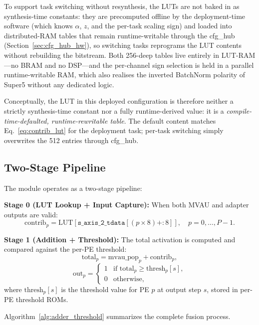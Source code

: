 \documentclass[12pt, a4paper]{report}
\numberwithin{equation}{chapter}
\numberwithin{figure}{chapter}
\numberwithin{table}{chapter}
\numberwithin{algorithm}{chapter}
\begin{document}
To support task switching without resynthesis, the LUTs are not baked in as synthesis-time constants: they are precomputed offline by the deployment-time software (which knows $\alpha$, $z$, and the per-task scaling sign) and loaded into distributed-RAM tables that remain runtime-writable through the cfg\_hub (Section~\ref{sec:cfg_hub_hw}), so switching tasks reprograms the LUT contents without rebuilding the bitstream. Both 256-deep tables live entirely in LUT-RAM---no BRAM and no DSP---and the per-channel sign selection is held in a parallel runtime-writable RAM, which also realises the inverted BatchNorm polarity of Super5 without any dedicated logic.

Conceptually, the LUT in this deployed configuration is therefore neither a strictly synthesis-time constant nor a fully runtime-derived value: it is a \emph{compile-time-defaulted, runtime-rewritable table}. The default content matches Eq.~\eqref{eq:contrib_lut} for the deployment task; per-task switching simply overwrites the 512 entries through cfg\_hub.

\subsection{Two-Stage Pipeline}

The module operates as a two-stage pipeline:

\textbf{Stage 0 (LUT Lookup + Input Capture):} When both MVAU and adapter outputs are valid:
\begin{equation}
\text{contrib}_p = \text{LUT}[\texttt{s\_axis\_2\_tdata}[(p \times 8) +: 8]], \quad p = 0, \ldots, P-1.
\end{equation}

\textbf{Stage 1 (Addition + Threshold):} The total activation is computed and compared against the per-PE threshold:
\begin{equation}
\text{total}_p = \text{mvau\_pop}_p + \text{contrib}_p,
\end{equation}
\begin{equation}
\text{out}_p = \begin{cases} 1 & \text{if } \text{total}_p \geq \text{thresh}_p[s], \\ 0 & \text{otherwise,} \end{cases}
\end{equation}
where $\text{thresh}_p[s]$ is the threshold value for PE $p$ at output step $s$, stored in per-PE threshold ROMs.

Algorithm~\ref{alg:adder_threshold} summarizes the complete fusion process.
\end{document}
